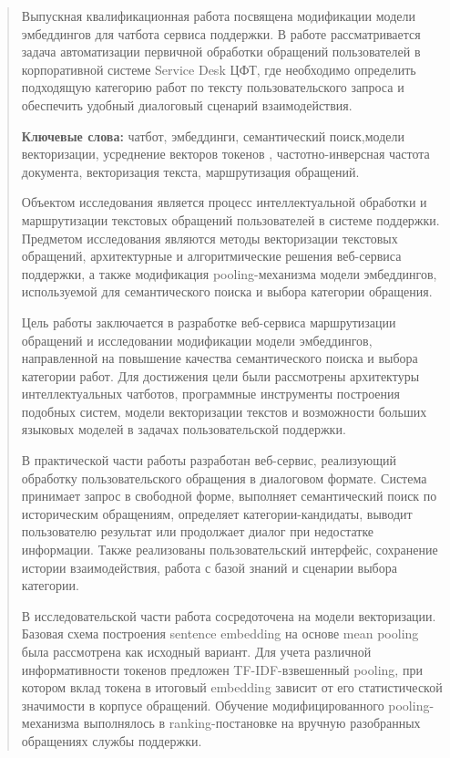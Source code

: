 \documentclass[
]{article}
\begin{document}
\begin{quote}
Выпускная квалификационная работа посвящена модификации модели
эмбеддингов для чатбота сервиса поддержки. В работе рассматривается
задача автоматизации первичной обработки обращений пользователей в
корпоративной системе Service Desk ЦФТ, где необходимо определить
подходящую категорию работ по тексту пользовательского запроса и
обеспечить удобный диалоговый сценарий взаимодействия.

\textbf{Ключевые слова:} чатбот, эмбеддинги, семантический поиск,модели
векторизации, усреднение векторов токенов , частотно-инверсная частота
документа, векторизация текста, маршрутизация обращений.

Объектом исследования является процесс интеллектуальной обработки и
маршрутизации текстовых обращений пользователей в системе поддержки.
Предметом исследования являются методы векторизации текстовых обращений,
архитектурные и алгоритмические решения веб-сервиса поддержки, а также
модификация pooling-механизма модели эмбеддингов, используемой для
семантического поиска и выбора категории обращения.

Цель работы заключается в разработке веб-сервиса маршрутизации обращений
и исследовании модификации модели эмбеддингов, направленной на повышение
качества семантического поиска и выбора категории работ. Для достижения
цели были рассмотрены архитектуры интеллектуальных чатботов, программные
инструменты построения подобных систем, модели векторизации текстов и
возможности больших языковых моделей в задачах пользовательской
поддержки.

В практической части работы разработан веб-сервис, реализующий обработку
пользовательского обращения в диалоговом формате. Система принимает
запрос в свободной форме, выполняет семантический поиск по историческим
обращениям, определяет категории-кандидаты, выводит пользователю
результат или продолжает диалог при недостатке информации. Также
реализованы пользовательский интерфейс, сохранение истории
взаимодействия, работа с базой знаний и сценарии выбора категории.

В исследовательской части работа сосредоточена на модели векторизации.
Базовая схема построения sentence embedding на основе mean pooling была
рассмотрена как исходный вариант. Для учета различной информативности
токенов предложен TF-IDF-взвешенный pooling, при котором вклад токена в
итоговый embedding зависит от его статистической значимости в корпусе
обращений. Обучение модифицированного pooling-механизма выполнялось в
ranking-постановке на вручную разобранных обращениях службы поддержки.
\end{quote}
\end{document}

